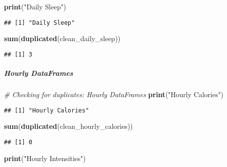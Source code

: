\documentclass[
]{article}
\newenvironment{Shaded}{\begin{snugshade}}{\end{snugshade}}
\newcommand{\CommentTok}[1]{\textcolor[rgb]{0.56,0.35,0.01}{\textit{#1}}}
\newcommand{\FunctionTok}[1]{\textcolor[rgb]{0.13,0.29,0.53}{\textbf{#1}}}
\newcommand{\NormalTok}[1]{#1}
\newcommand{\StringTok}[1]{\textcolor[rgb]{0.31,0.60,0.02}{#1}}
\begin{document}
\begin{Shaded}
\begin{Highlighting}[]
\FunctionTok{print}\NormalTok{(}\StringTok{"Daily Sleep"}\NormalTok{)}
\end{Highlighting}
\end{Shaded}

\begin{verbatim}
## [1] "Daily Sleep"
\end{verbatim}

\begin{Shaded}
\begin{Highlighting}[]
\FunctionTok{sum}\NormalTok{(}\FunctionTok{duplicated}\NormalTok{(clean\_daily\_sleep))}
\end{Highlighting}
\end{Shaded}

\begin{verbatim}
## [1] 3
\end{verbatim}

\hypertarget{hourly-dataframes-5}{%
\subparagraph{Hourly DataFrames}\label{hourly-dataframes-5}}

\begin{Shaded}
\begin{Highlighting}[]
\CommentTok{\# Checking for duplicates: Hourly DataFrames}
\FunctionTok{print}\NormalTok{(}\StringTok{"Hourly Calories"}\NormalTok{)}
\end{Highlighting}
\end{Shaded}

\begin{verbatim}
## [1] "Hourly Calories"
\end{verbatim}

\begin{Shaded}
\begin{Highlighting}[]
\FunctionTok{sum}\NormalTok{(}\FunctionTok{duplicated}\NormalTok{(clean\_hourly\_calories))}
\end{Highlighting}
\end{Shaded}

\begin{verbatim}
## [1] 0
\end{verbatim}

\begin{Shaded}
\begin{Highlighting}[]
\FunctionTok{print}\NormalTok{(}\StringTok{"Hourly Intensities"}\NormalTok{)}
\end{Highlighting}
\end{Shaded}
\end{document}
